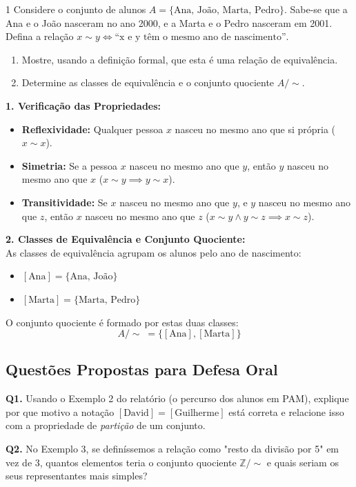 \begin{exercisebox}{1}
  Considere o conjunto de alunos $A = \{\text{Ana, João, Marta, Pedro}\}$. Sabe-se que a Ana e o João nasceram no ano 2000, e a Marta e o Pedro nasceram em 2001. Defina a relação $x \sim y \iff \text{``x e y têm o mesmo ano de nascimento''}$.
  \begin{enumerate}
      \item Mostre, usando a definição formal, que esta é uma relação de equivalência.
      \item Determine as classes de equivalência e o conjunto quociente $A/\sim$.
  \end{enumerate}
\end{exercisebox}
\begin{solbox}
  \textbf{1. Verificação das Propriedades:}
  \begin{itemize}
      \item \textbf{Reflexividade:} Qualquer pessoa $x$ nasceu no mesmo ano que si própria ($x \sim x$). \checkmark
      \item \textbf{Simetria:} Se a pessoa $x$ nasceu no mesmo ano que $y$, então $y$ nasceu no mesmo ano que $x$ ($x \sim y \implies y \sim x$). \checkmark
      \item \textbf{Transitividade:} Se $x$ nasceu no mesmo ano que $y$, e $y$ nasceu no mesmo ano que $z$, então $x$ nasceu no mesmo ano que $z$ ($x \sim y \land y \sim z \implies x \sim z$). \checkmark
  \end{itemize}
  
  \textbf{2. Classes de Equivalência e Conjunto Quociente:} \\
  As classes de equivalência agrupam os alunos pelo ano de nascimento:
  \begin{itemize}
      \item $[\text{Ana}] = \{\text{Ana, João}\}$
      \item $[\text{Marta}] = \{\text{Marta, Pedro}\}$
  \end{itemize}
  O conjunto quociente é formado por estas duas classes: 
  \[
      A/\sim \; = \{ [\text{Ana}], [\text{Marta}] \}
  \]
\end{solbox}

\subsection{Questões Propostas para Defesa Oral}

\begin{oralbox}
  \textbf{Q1.} Usando o Exemplo 2 do relatório (o percurso dos alunos em PAM), explique por que motivo a notação $[\text{David}] = [\text{Guilherme}]$ está correta e relacione isso com a propriedade de \emph{partição} de um conjunto.
\end{oralbox}

\begin{oralbox}
  \textbf{Q2.} No Exemplo 3, se definíssemos a relação como "resto da divisão por 5" em vez de 3, quantos elementos teria o conjunto quociente $\mathbb{Z}/\sim$ e quais seriam os seus representantes mais simples?
\end{oralbox}